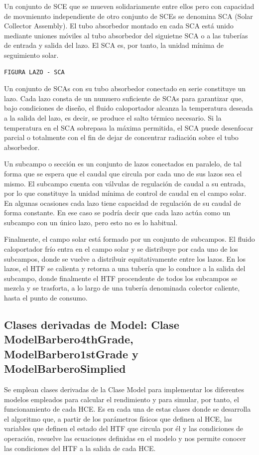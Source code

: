 Un conjunto de SCE que se mueven solidariamente entre ellos pero con capacidad de movmiennto independiente de otro conjunto de SCEs se denomina SCA (Solar Collector Assembly). El tubo absorbedor montado en cada SCA está unido mediante uniones móviles al tubo absorbedor del siguietne SCA o a las tuberías de entrada y salida del lazo. El SCA es, por tanto, la unidad mínima de seguimiento solar.

\begin{verbatim}
FIGURA LAZO - SCA
\end{verbatim}

Un conjunto de SCAs con su tubo absorbedor conectado en serie constituye un lazo. Cada lazo consta de un numuero suficiente de SCAs para garantizar que, bajo condiciones de diseño, el fluido caloportador alcanza la temperatura deseada a la salida del lazo, es decir, se produce el salto térmico necesario. Si la temperatura en el SCA sobrepasa la máxima permitida, el SCA puede desenfocar parcial o totalmente con el fin de dejar de concentrar radiación sobre el tubo absorbedor.

Un subcampo o sección es un conjunto de lazos conectados en paralelo, de tal forma que se espera que el caudal que circula por cada uno de sus lazos sea el mismo. El subcampo cuenta con válvulas de regulación de caudal a su entrada, por lo que constituye la unidad mínima de control de caudal en el campo solar. En algunas ocasiones cada lazo tiene capacidad de regulación de su caudal de forma constante. En ese caso se podría decir que cada lazo actúa como un subcampo con un único lazo, pero esto no es lo habitual.

Finalmente, el campo solar está formado por un conjunto de subcampos. El fluido caloportador frío entra en el campo solar y se distribuye por cada uno de los subcampos, donde se vuelve a distribuir equitativamente entre los lazos. En los lazos, el HTF se calienta y retorna a una tubería que lo conduce a la salida del subcampo, donde finalmente el HTF procendente de todos los subcampos se mezcla y se trasforta, a lo largo de una tubería denominada colector caliente, hasta el punto de consumo.

\subsection{Clases derivadas de Model: Clase ModelBarbero4thGrade, ModelBarbero1stGrade y ModelBarberoSimplied}

Se emplean clases derivadas de la Clase Model para implementar los diferentes modelos empleados para calcular el rendimiento y para simular, por tanto, el funcionamiento de cada HCE. Es en cada una de estas clases donde se desarrolla el algoritmo que, a partir de los parámetros físicos que definen al HCE, las variables que definen el estado del HTF que circula por él y las condiciones de operación, resuelve las ecuaciones definidas en el modelo y nos permite conocer las condiciones del HTF a la salida de cada HCE.

